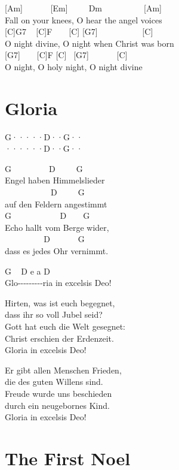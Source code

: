\documentclass[
  letterpaper,
  twoside=false]{scrbook}
\begin{document}
{[}Am{]} ~ ~ ~ ~{[}Em{]} ~ ~ ~Dm ~ ~ ~ ~ ~ ~{[}Am{]}\\
Fall on your knees, O hear the angel voices\\
{[}C{]}G7 ~ {[}C{]}F ~ ~ {[}C{]} {[}G7{]} ~ ~ ~ ~ ~ ~ {[}C{]}\\
O night divine, O night when Christ was born\\
{[}G7{]} ~ ~ {[}C{]}F {[}C{]} ~{[}G7{]} ~ ~ ~ ~{[}C{]}\\
O night, O holy night, O night divine

\hypertarget{gloria}{%
\chapter{Gloria}\label{gloria}}

\textbar G·····\textbar D··G··\textbar{}\\
\textbar······\textbar D··G··\textbar{}

G ~ ~ ~ ~ ~ D ~ ~ ~G\\
Engel haben Himmelslieder\\
\hspace*{0.333em} ~ ~ ~ ~ ~ ~ ~D ~ ~ ~G\\
auf den Feldern angestimmt\\
G ~ ~ ~ ~ ~ ~ ~D ~ ~ G\\
Echo hallt vom Berge wider,\\
\hspace*{0.333em} ~ ~ ~ ~ ~ ~D ~ ~ ~ ~G\\
dass es jedes Ohr vernimmt.

G ~ D e a D\\
Glo-\/-\/-\/-\/-\/-\/-\/-\/-ria in excelsis Deo!

Hirten, was ist euch begegnet,\\
dass ihr so voll Jubel seid?\\
Gott hat euch die Welt gesegnet:\\
Christ erschien der Erdenzeit.\\
Gloria in excelsis Deo!

Er gibt allen Menschen Frieden,\\
die des guten Willens sind.\\
Freude wurde uns beschieden\\
durch ein neugebornes Kind.\\
Gloria in excelsis Deo!

\hypertarget{the-first-noel}{%
\chapter{The First Noel}\label{the-first-noel}}
\end{document}
